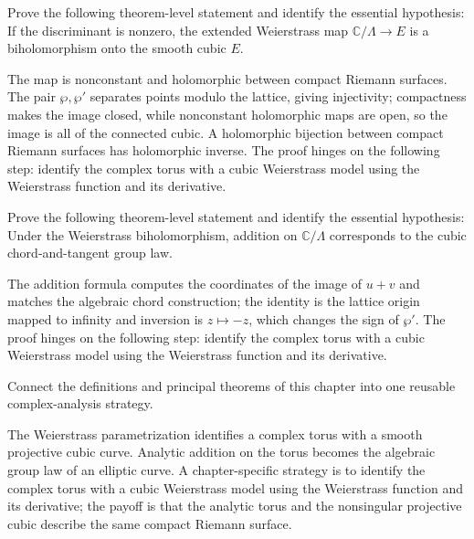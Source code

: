 \begin{problem}\label{prob:iv31-problem-10}
Prove the following theorem-level statement and identify the essential hypothesis: If the discriminant is nonzero, the extended Weierstrass map $\mathbb C/\Lambda\to E$ is a biholomorphism onto the smooth cubic $E$.
\end{problem}
\begin{solution}
The map is nonconstant and holomorphic between compact Riemann surfaces. The pair $\wp,\wp'$ separates points modulo the lattice, giving injectivity; compactness makes the image closed, while nonconstant holomorphic maps are open, so the image is all of the connected cubic. A holomorphic bijection between compact Riemann surfaces has holomorphic inverse. The proof hinges on the following step: identify the complex torus with a cubic Weierstrass model using the Weierstrass function and its derivative.
\end{solution}

\begin{problem}\label{prob:iv31-problem-11}
Prove the following theorem-level statement and identify the essential hypothesis: Under the Weierstrass biholomorphism, addition on $\mathbb C/\Lambda$ corresponds to the cubic chord-and-tangent group law.
\end{problem}
\begin{solution}
The addition formula computes the coordinates of the image of $u+v$ and matches the algebraic chord construction; the identity is the lattice origin mapped to infinity and inversion is $z\mapsto-z$, which changes the sign of $\wp'$. The proof hinges on the following step: identify the complex torus with a cubic Weierstrass model using the Weierstrass function and its derivative.
\end{solution}

\begin{problem}\label{prob:iv31-problem-12}
Connect the definitions and principal theorems of this chapter into one reusable complex-analysis strategy.
\end{problem}
\begin{solution}
The Weierstrass parametrization identifies a complex torus with a smooth projective cubic curve. Analytic addition on the torus becomes the algebraic group law of an elliptic curve. A chapter-specific strategy is to identify the complex torus with a cubic Weierstrass model using the Weierstrass function and its derivative; the payoff is that the analytic torus and the nonsingular projective cubic describe the same compact Riemann surface.
\end{solution}

